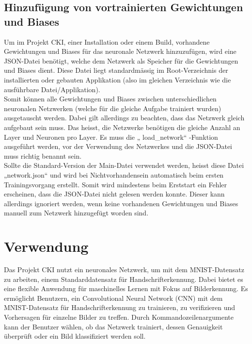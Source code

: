 \subsection{Hinzufügung von vortrainierten Gewichtungen und Biases}
\label{sec:InstallHinzufügungVonVortrainiertenGewichtungenUndBiases}
Um im Projekt CKI, einer Installation oder einem Build, vorhandene Gewichtungen und Biases für das neuronale Netzwerk hinzuzufügen, wird eine JSON-Datei benötigt, welche dem Netzwerk als Speicher für die Gewichtungen und Biases dient. Diese Datei liegt standardmässig im Root-Verzeichnis der installierten oder gebauten Applikation (also im gleichen Verzeichnis wie die ausführbare Datei/Applikation).
\\
Somit können alle Gewichtungen und Biases zwischen unterschiedlichen neuronalen Netzwerken (welche für die gleiche Aufgabe trainiert wurden) ausgetauscht werden. Dabei gilt allerdings zu beachten, dass das Netzwerk gleich aufgebaut sein muss. Das heisst, die Netzwerke benötigen die gleiche Anzahl an Layer und Neuronen pro Layer. Es muss die „ load\_network“ -Funktion ausgeführt werden, vor der Verwendung des Netzwerkes und die JSON-Datei muss richtig benannt sein.
\\
Sollte die Standard-Version der Main-Datei verwendet werden, heisst diese Datei „network.json“ und wird bei Nichtvorhandensein automatisch beim ersten Trainingsvorgang erstellt. Somit wird mindestens beim Erststart ein Fehler erscheinen, dass die JSON-Datei nicht gelesen werden konnte. Dieser kann allerdings ignoriert werden, wenn keine vorhandenen Gewichtungen und Biases manuell zum Netzwerk hinzugefügt worden sind.

\section{Verwendung}
Das Projekt CKI nutzt ein neuronales Netzwerk, um mit dem MNIST-Datensatz zu arbeiten, einem Standarddatensatz für Handschrifterkennung. Dabei bietet es eine flexible Anwendung für maschinelles Lernen mit Fokus auf Bilderkennung. Es ermöglicht Benutzern, ein Convolutional Neural Network (CNN) mit dem MNIST-Datensatz für Handschrifterkennung zu trainieren, zu verifizieren und Vorhersagen für einzelne Bilder zu treffen. Durch Kommandozeilenargumente kann der Benutzer wählen, ob das Netzwerk trainiert, dessen Genauigkeit überprüft oder ein Bild klassifiziert werden soll. 
